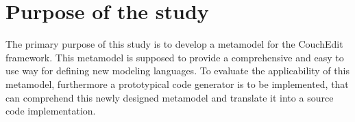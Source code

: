 \documentclass[10pt,a4paper,oneside]{scrartcl}
\newcommand\hint[2]{
\ifthenelse{\boolean{showhints}}{
\begin{center}
\colorbox{black!10}{
\begin{minipage}{.963\textwidth}
#2\hfill\textbf{#1}
\end{minipage}
}\end{center}}{}
}
\begin{document}





\section{Purpose of the study}


The primary purpose of this study is to develop a metamodel for the CouchEdit framework. This metamodel is supposed to provide a comprehensive and easy to use way for defining new modeling languages. To evaluate the applicability of this metamodel, furthermore a prototypical code generator is to be implemented, that can comprehend this newly designed metamodel and translate it into a source code implementation.
\end{document}
